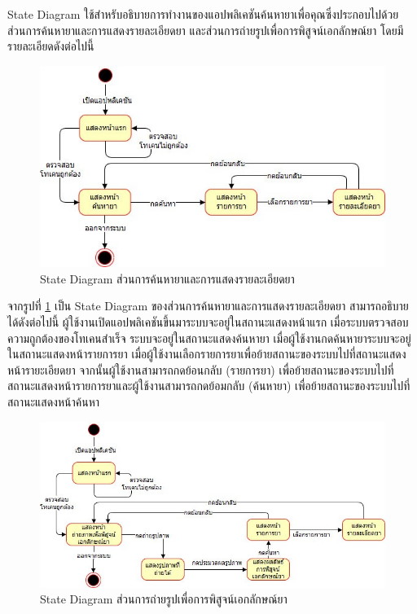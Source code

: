 	State Diagram ใช้สำหรับอธิบายการทำงานของแอปพลิเคชันค้นหายาเพื่อคุณซึ่งประกอบไปด้วย ส่วนการค้นหายาและการแสดงรายละเอียดยา และส่วนการถ่ายรูปเพื่อการพิสูจน์เอกลักษณ์ยา โดยมีรายละเอียดดังต่อไปนี้

	\begin{figure}[H]
		\includegraphics[width=\columnwidth]{Figures/3/state1}
		\caption{State Diagram ส่วนการค้นหายาและการแสดงรายละเอียดยา}
		\label{Fig:state1}
	\end{figure}

	จากรูปที่ \ref{Fig:state1} เป็น State Diagram ของส่วนการค้นหายาและการแสดงรายละเอียดยา สามารถอธิบายได้ดังต่อไปนี้ ผู้ใช้งานเปิดแอปพลิเคชันขึ้นมาระบบจะอยู่ในสถานะแสดงหน้าแรก เมื่อระบบตรวจสอบความถูกต้องของโทเคนสำเร็จ ระบบจะอยู่ในสถานะแสดงค้นหายา เมื่อผู้ใช้งานกดค้นหายาระบบจะอยู่ในสถานะแสดงหน้ารายการยา เมื่อผู้ใช้งานเลือกรายการยาเพื่อย้ายสถานะของระบบไปที่สถานะแสดงหน้ารายะเอียดยา จากนั้นผู้ใช้งานสามารถกดย้อนกลับ (รายการยา) เพื่อย้ายสถานะของระบบไปที่สถานะแสดงหน้ารายการยาและผู้ใช้งานสามารถกดย้อมกลับ (ค้นหายา) เพื่อย้ายสถานะของระบบไปที่สถานะแสดงหน้าค้นหา

	\begin{figure}[H]
		\includegraphics[width=\columnwidth]{Figures/3/state2}
		\caption{State Diagram ส่วนการถ่ายรูปเพื่อการพิสูจน์เอกลักษณ์ยา}
		\label{Fig:state2}
	\end{figure}

